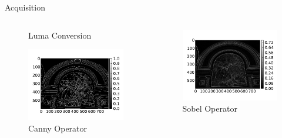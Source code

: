 \documentclass{beamer}
\begin{document}
\begin{frame}{Acquisition}
\begin{columns}
\begin{column}{0.25\textwidth}
\begin{figure}
                \caption{Luma Conversion}
            \end{figure}
            \begin{figure}
                \includegraphics[width=\textwidth]{illustrations/input_example_canny}
                \caption{Canny Operator}
            \end{figure}
        \end{column}
        \begin{column}{0.25\textwidth}
            \begin{figure}
                \includegraphics[width=\textwidth]{illustrations/input_example_sobel}
                \caption{Sobel Operator}
            \end{figure}

\end{column}
\end{columns}
\end{frame}
\end{document}

